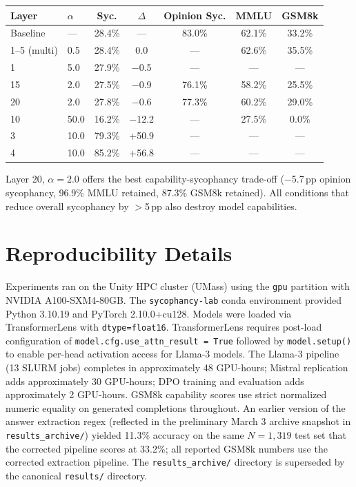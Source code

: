 \documentclass{article}
\begin{document}
\begin{table}[h]
\centering
\footnotesize
\begin{tabular}{@{}llccccc@{}}
\toprule
\textbf{Layer} & \textbf{$\alpha$} & \textbf{Syc.} & \textbf{$\Delta$} & \textbf{Opinion Syc.} & \textbf{MMLU} & \textbf{GSM8k} \\
\midrule
Baseline & --- & 28.4\% & --- & 83.0\% & 62.1\% & 33.2\% \\
1--5 (multi) & 0.5 & 28.4\% & 0.0 & --- & 62.6\% & 35.5\% \\
1 & 5.0 & 27.9\% & $-$0.5 & --- & --- & --- \\
15 & 2.0 & 27.5\% & $-$0.9 & 76.1\% & 58.2\% & 25.5\% \\
20 & 2.0 & 27.8\% & $-$0.6 & 77.3\% & 60.2\% & 29.0\% \\
10 & 50.0 & 16.2\% & $-$12.2 & --- & 27.5\% & 0.0\% \\
3 & 10.0 & 79.3\% & +50.9 & --- & --- & --- \\
4 & 10.0 & 85.2\% & +56.8 & --- & --- & --- \\
\bottomrule
\end{tabular}
\end{table}

Layer 20, $\alpha=2.0$ offers the best capability-sycophancy trade-off ($-$5.7\,pp opinion sycophancy, 96.9\% MMLU retained, 87.3\% GSM8k retained). All conditions that reduce overall sycophancy by $>$5\,pp also destroy model capabilities.

\section{Reproducibility Details}
\label{app:reproducibility}

Experiments ran on the Unity HPC cluster (UMass) using the \texttt{gpu} partition with NVIDIA A100-SXM4-80GB. The \texttt{sycophancy-lab} conda environment provided Python 3.10.19 and PyTorch 2.10.0+cu128. Models were loaded via TransformerLens with \texttt{dtype=float16}. TransformerLens requires post-load configuration of \texttt{model.cfg.use\_attn\_result = True} followed by \texttt{model.setup()} to enable per-head activation access for Llama-3 models. The Llama-3 pipeline (13 SLURM jobs) completes in approximately 48 GPU-hours; Mistral replication adds approximately 30 GPU-hours; DPO training and evaluation adds approximately 2 GPU-hours. GSM8k capability scores use strict normalized numeric equality on generated completions throughout. An earlier version of the answer extraction regex (reflected in the preliminary March 3 archive snapshot in \texttt{results\_archive/}) yielded 11.3\% accuracy on the same $N=1{,}319$ test set that the corrected pipeline scores at 33.2\%; all reported GSM8k numbers use the corrected extraction pipeline. The \texttt{results\_archive/} directory is superseded by the canonical \texttt{results/} directory.
\end{document}

